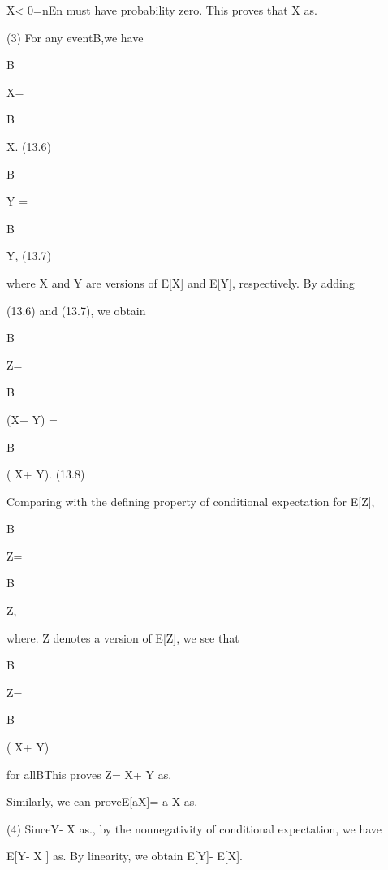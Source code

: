 { X< 0}=\cup nEn must have probability zero. This proves that X as.

(3) For any eventB\in {},we have

\int

B

X=

\int

B

X. (13.6)

\int

B

Y =

\int

B

Y, (13.7)

where X and Y are versions of E[X\vert{}] and E[Y\vert{}], respectively. By adding

(13.6) and (13.7), we obtain

\int

B

Z=

\int

B

(X+ Y) =

\int

B

( X+ Y). (13.8)

Comparing with the defining property of conditional expectation for E[Z\vert{}],

\int

B

Z=

\int

B

Z,

where. Z denotes a version of E[Z\vert{}], we see that

\int

B

Z=

\int

B

( X+ Y)

for allB\in {}This proves Z= X+ Y as.

Similarly, we can proveE[aX\vert{}]= a X as.

(4) SinceY- X  as., by the nonnegativity of conditional expectation, we have

E[Y- X \vert{}] as. By linearity, we obtain E[Y\vert{}]- E[X\vert{}].

